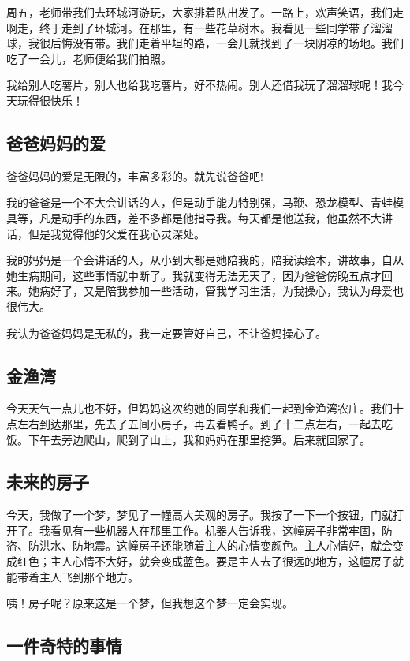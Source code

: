 \documentclass[UTF8,a4paper,titlepage,twoside,10.5pt]{article}
\begin{document}
周五，老师带我们去环城河游玩，大家排着队出发了。一路上，欢声笑语，我们走啊走，终于走到了环城河。在那里，有一些花草树木。我看见一些同学带了溜溜球，我很后悔没有带。我们走着平坦的路，一会儿就找到了一块阴凉的场地。我们吃了一会儿，老师便给我们拍照。

我给别人吃薯片，别人也给我吃薯片，好不热闹。别人还借我玩了溜溜球呢！我今天玩得很快乐！

\subsection{爸爸妈妈的爱}
\label{sec:orgf8e3f73}

爸爸妈妈的爱是无限的，丰富多彩的。就先说爸爸吧!

我的爸爸是一个不大会讲话的人，但是动手能力特别强，马鞭、恐龙模型、青蛙模具等，凡是动手的东西，差不多都是他指导我。每天都是他送我，他虽然不大讲话，但是我觉得他的父爱在我心灵深处。

我的妈妈是一个会讲话的人，从小到大都是她陪我的，陪我读绘本，讲故事，自从她生病期间，这些事情就中断了。我就变得无法无天了，因为爸爸傍晚五点才回来。她病好了，又是陪我参加一些活动，管我学习生活，为我操心，我认为母爱也很伟大。

我认为爸爸妈妈是无私的，我一定要管好自己，不让爸妈操心了。

\subsection{金渔湾}
\label{sec:org0f95e1f}

今天天气一点儿也不好，但妈妈这次约她的同学和我们一起到金渔湾农庄。我们十点左右到达那里，先去了五间小房子，再去看鸭子。到了十二点左右，一起去吃饭。下午去旁边爬山，爬到了山上，我和妈妈在那里挖笋。后来就回家了。

\subsection{未来的房子}
\label{sec:org0c49751}

今天，我做了一个梦，梦见了一幢高大美观的房子。我按了一下一个按钮，门就打开了。我看见有一些机器人在那里工作。机器人告诉我，这幢房子非常牢固，防盗、防洪水、防地震。这幢房子还能随着主人的心情变颜色。主人心情好，就会变成红色；主人心情不大好，就会变成蓝色。要是主人去了很远的地方，这幢房子就能带着主人飞到那个地方。

咦！房子呢？原来这是一个梦，但我想这个梦一定会实现。

\subsection{一件奇特的事情}
\label{sec:org8b65f93}
\end{document}
